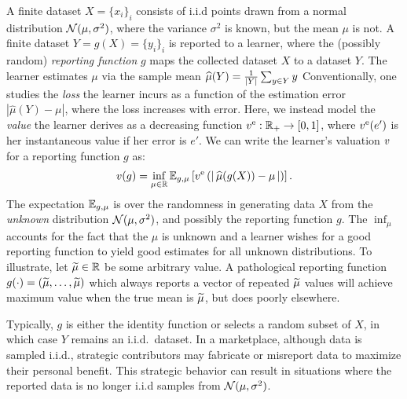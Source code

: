 A finite dataset $X=\{x_i\}_{i}$ consists of i.i.d points drawn from 
a normal distribution $\mathcal{N}(\mu,\sigma^2)$, where the variance $\sigma^2$ is known, but the mean $\mu$ is not.
A finite dataset $Y=g(X) = \{y_i\}_i$
is reported to a learner,
where the (possibly random) \emph{reporting function} $g$ maps the collected dataset $X$ to a
dataset $Y$.
The learner estimates $\mu$ via the sample mean $\widehat{\mu}(Y) = \frac{1}{|Y|}\sum_{y \in Y} y$
Conventionally, one studies the \emph{loss} the learner incurs as a function of the estimation error \( |\hat{\mu}(Y) - \mu| \), where the loss increases with error.  
Here, we instead model the \emph{value} the learner derives as a decreasing function \( v^{\rm e}: \mathbb{R}_+ \to [0,1] \), where $v^{\rm e}(e')$ is her instantaneous value if her error is $e'$. %
We can write the learner's valuation $v$ for a reporting function $g$ as:
\begin{align}
    \label{eqn:valerr}
    v(g) = \inf_{\mu\in\mathbb{R}} \mathbb{E}_{g,\mu}\left[
        v^{\rm e}\left(\left|\,\widehat{\mu}(g(X)) - \mu\,\right|\right)
    \right].
\end{align}
The expectation $\mathbb{E}_{g, \mu}$ is over the randomness in generating
data $X$ from the \emph{unknown} distribution $\mathcal{N}(\mu, \sigma^2)$, and possibly the reporting function $g$.
The $\inf_\mu$ accounts for the fact that the $\mu$ is unknown
and a learner wishes for a good reporting function to yield good estimates for all unknown distributions.
To illustrate, let $\widetilde{\mu}\in\mathbb{R}$ be some arbitrary value. A pathological reporting function $g(\cdot) = (\widetilde{\mu}, \dots, \widetilde{\mu})$ which always reports a vector of repeated $\widetilde{\mu}$ values will achieve maximum
value when the true mean is $\widetilde{\mu}$, but does poorly elsewhere.

Typically, \( g \) is either the identity function or selects a random subset of \( X \), in which case \( Y \) remains an i.i.d.\ dataset.  
In a marketplace, although data is sampled i.i.d., strategic contributors  may fabricate or misreport data to maximize their personal benefit.  
This strategic behavior can result in situations where the reported data is no longer i.i.d  samples from $\mathcal{N}(\mu,\sigma^2)$.

